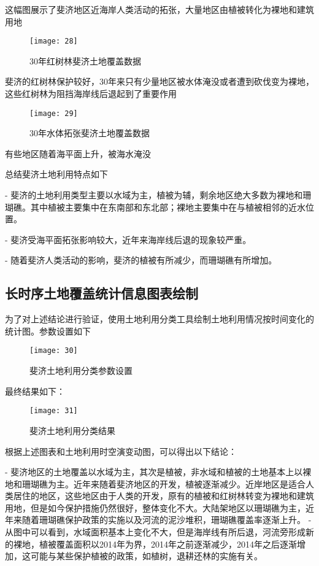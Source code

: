 \documentclass{source/Report}
\begin{document}
这幅图展示了斐济地区近海岸人类活动的拓张，大量地区由植被转化为裸地和建筑用地

\begin{figure}[H]
    \centering
    \texttt{[image: 28]}
    \caption{30年红树林斐济土地覆盖数据}
\end{figure}

斐济的红树林保护较好，30年来只有少量地区被水体淹没或者遭到砍伐变为裸地，这些红树林为阻挡海岸线后退起到了重要作用

\begin{figure}[H]
    \centering
    \texttt{[image: 29]}
    \caption{30年水体拓张斐济土地覆盖数据}
\end{figure}

有些地区随着海平面上升，被海水淹没

总结斐济土地利用特点如下

- 斐济的土地利用类型主要以水域为主，植被为辅，剩余地区绝大多数为裸地和珊瑚礁。其中植被主要集中在东南部和东北部；裸地主要集中在与植被相邻的近水位置。

- 斐济受海平面拓张影响较大，近年来海岸线后退的现象较严重。

- 随着斐济人类活动的影响，斐济的植被有所减少，而珊瑚礁有所增加。

\subsection{长时序土地覆盖统计信息图表绘制}

为了对上述结论进行验证，使用土地利用分类工具绘制土地利用情况按时间变化的统计图。参数设置如下

\begin{figure}[H]
    \centering
    \texttt{[image: 30]}
    \caption{斐济土地利用分类参数设置}
\end{figure}

最终结果如下：

\begin{figure}[H]
    \centering
    \texttt{[image: 31]}
    \caption{斐济土地利用分类结果}
\end{figure}

根据上述图表和土地利用时空演变动图，可以得出以下结论：

- 斐济地区的土地覆盖以水域为主，其次是植被，非水域和植被的土地基本上以裸地和珊瑚礁为主。近年来随着斐济地区的开发，植被逐渐减少。近岸地区是适合人类居住的地区，这些地区由于人类的开发，原有的植被和红树林转变为裸地和建筑用地，但是如今保护措施仍然很好，整体变化不大。大陆架地区以珊瑚礁为主，近年来随着珊瑚礁保护政策的实施以及河流的泥沙堆积，珊瑚礁覆盖率逐渐上升。
- 从图中可以看到，水域面积基本上变化不大，但是海岸线有所后退，河流旁形成新的裸地，植被覆盖面积以2014年为界，2014年之前逐渐减少，2014年之后逐渐增加，这可能与某些保护植被的政策，如植树，退耕还林的实施有关。
\end{document}
